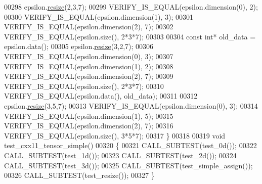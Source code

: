 \begin{DoxyCode}
00298   epsilon.\hyperlink{class_eigen_1_1_tensor_a5ab1ec6dc9b05d5e4db3600bc9d2cc6b}{resize}(2,3,7);
00299   VERIFY\_IS\_EQUAL(epsilon.dimension(0), 2);
00300   VERIFY\_IS\_EQUAL(epsilon.dimension(1), 3);
00301   VERIFY\_IS\_EQUAL(epsilon.dimension(2), 7);
00302   VERIFY\_IS\_EQUAL(epsilon.size(), 2*3*7);
00303 
00304   \textcolor{keyword}{const} \textcolor{keywordtype}{int}* old\_data = epsilon.data();
00305   epsilon.\hyperlink{class_eigen_1_1_tensor_a5ab1ec6dc9b05d5e4db3600bc9d2cc6b}{resize}(3,2,7);
00306   VERIFY\_IS\_EQUAL(epsilon.dimension(0), 3);
00307   VERIFY\_IS\_EQUAL(epsilon.dimension(1), 2);
00308   VERIFY\_IS\_EQUAL(epsilon.dimension(2), 7);
00309   VERIFY\_IS\_EQUAL(epsilon.size(), 2*3*7);
00310   VERIFY\_IS\_EQUAL(epsilon.data(), old\_data);
00311 
00312   epsilon.\hyperlink{class_eigen_1_1_tensor_a5ab1ec6dc9b05d5e4db3600bc9d2cc6b}{resize}(3,5,7);
00313   VERIFY\_IS\_EQUAL(epsilon.dimension(0), 3);
00314   VERIFY\_IS\_EQUAL(epsilon.dimension(1), 5);
00315   VERIFY\_IS\_EQUAL(epsilon.dimension(2), 7);
00316   VERIFY\_IS\_EQUAL(epsilon.size(), 3*5*7);
00317 \}
00318 
00319 \textcolor{keywordtype}{void} test\_cxx11\_tensor\_simple()
00320 \{
00321   CALL\_SUBTEST(test\_0d());
00322   CALL\_SUBTEST(test\_1d());
00323   CALL\_SUBTEST(test\_2d());
00324   CALL\_SUBTEST(test\_3d());
00325   CALL\_SUBTEST(test\_simple\_assign());
00326   CALL\_SUBTEST(test\_resize());
00327 \}
\end{DoxyCode}

